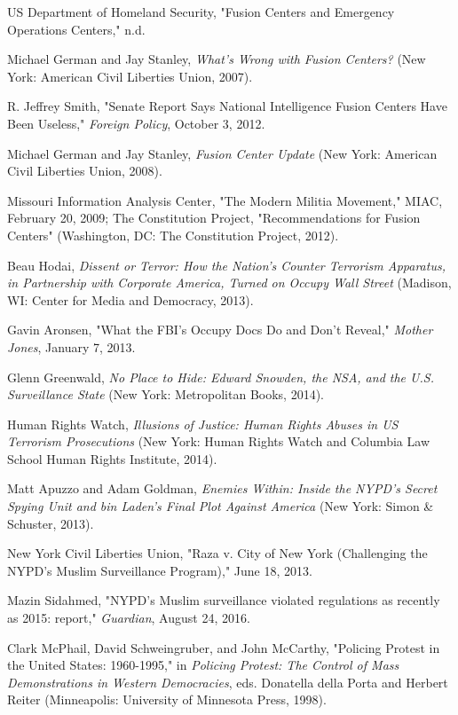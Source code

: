 \documentclass[fontset=fandol, a4paper, 12pt, openright]{ctexbook}
\begin{document}
\begin{enumerate}[label={[\arabic*]}]
    \item US Department of Homeland Security, "Fusion Centers and Emergency Operations Centers," n.d.
    \item Michael German and Jay Stanley, \textit{What's Wrong with Fusion Centers?} (New York: American Civil Liberties Union, 2007).
    \item R. Jeffrey Smith, "Senate Report Says National Intelligence Fusion Centers Have Been Useless," \textit{Foreign Policy}, October 3, 2012.
    \item Michael German and Jay Stanley, \textit{Fusion Center Update} (New York: American Civil Liberties Union, 2008).
    \item Missouri Information Analysis Center, "The Modern Militia Movement," MIAC, February 20, 2009; The Constitution Project, "Recommendations for Fusion Centers" (Washington, DC: The Constitution Project, 2012).
    \item Beau Hodai, \textit{Dissent or Terror: How the Nation's Counter Terrorism Apparatus, in Partnership with Corporate America, Turned on Occupy Wall Street} (Madison, WI: Center for Media and Democracy, 2013).
    \item Gavin Aronsen, "What the FBI's Occupy Docs Do and Don't Reveal," \textit{Mother Jones}, January 7, 2013.
    \item Glenn Greenwald, \textit{No Place to Hide: Edward Snowden, the NSA, and the U.S. Surveillance State} (New York: Metropolitan Books, 2014).
    \item Human Rights Watch, \textit{Illusions of Justice: Human Rights Abuses in US Terrorism Prosecutions} (New York: Human Rights Watch and Columbia Law School Human Rights Institute, 2014).
    \item Matt Apuzzo and Adam Goldman, \textit{Enemies Within: Inside the NYPD's Secret Spying Unit and bin Laden's Final Plot Against America} (New York: Simon \& Schuster, 2013).
    \item New York Civil Liberties Union, "Raza v. City of New York (Challenging the NYPD's Muslim Surveillance Program)," June 18, 2013.
    \item Mazin Sidahmed, "NYPD's Muslim surveillance violated regulations as recently as 2015: report," \textit{Guardian}, August 24, 2016.
    \item Clark McPhail, David Schweingruber, and John McCarthy, "Policing Protest in the United States: 1960-1995," in \textit{Policing Protest: The Control of Mass Demonstrations in Western Democracies}, eds. Donatella della Porta and Herbert Reiter (Minneapolis: University of Minnesota Press, 1998).

\end{enumerate}
\end{document}
